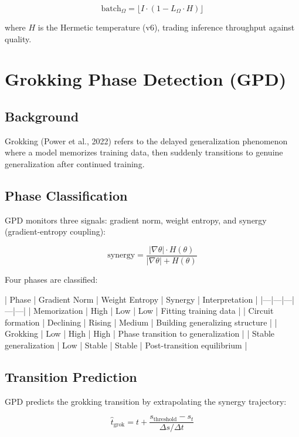 \documentclass[11pt]{article}
\theoremstyle{plain}
\begin{document}
\begin{equation}
\text{batch}_\Omega = \lfloor I \cdot (1 - L_\Omega \cdot H) \rfloor
\end{equation}

where \( H \) is the Hermetic temperature (v6), trading inference throughput against quality.


\section{Grokking Phase Detection (GPD)}

\subsection{Background}

Grokking (Power et al., 2022) refers to the delayed generalization phenomenon where a model memorizes training data, then suddenly transitions to genuine generalization after continued training.

\subsection{Phase Classification}

GPD monitors three signals: gradient norm, weight entropy, and synergy (gradient-entropy coupling):

\begin{equation}
\text{synergy} = \frac{|\nabla \theta| \cdot H(\theta)}{|\nabla \theta| + H(\theta)}
\end{equation}

Four phases are classified:

| Phase | Gradient Norm | Weight Entropy | Synergy | Interpretation |
|—|—|—|—|—|
| Memorization | High | Low | Low | Fitting training data |
| Circuit formation | Declining | Rising | Medium | Building generalizing structure |
| Grokking | Low | High | High | Phase transition to generalization |
| Stable generalization | Low | Stable | Stable | Post-transition equilibrium |

\subsection{Transition Prediction}

GPD predicts the grokking transition by extrapolating the synergy trajectory:

\begin{equation}
\hat{t}_{\text{grok}} = t + \frac{s_{\text{threshold}} - s_t}{\Delta s / \Delta t}
\end{equation}
\end{document}
